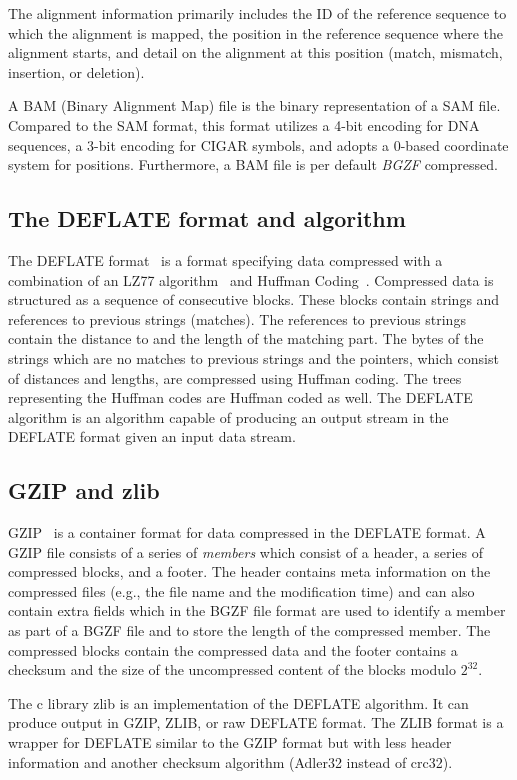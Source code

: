 The alignment information primarily includes the ID of the reference sequence to which the alignment is mapped, the position in the reference sequence where the alignment starts, and detail on the alignment at this position (match, mismatch, insertion, or deletion). 

A BAM (Binary Alignment Map) file is the binary representation of a SAM file. Compared to the SAM format, this format utilizes a 4-bit encoding for DNA sequences, a 3-bit encoding for CIGAR symbols, and adopts a 0-based coordinate system for positions. Furthermore, a BAM file is per default \textit{BGZF} compressed.

\subsection{The DEFLATE format and algorithm}
The DEFLATE format~\cite{deflate} is a format specifying data compressed with a combination of an LZ77 algorithm~\cite{ziv_universal_1977} and Huffman Coding~\cite{huffman_method_1952}. Compressed data is structured as a sequence of consecutive blocks. These blocks contain strings and references to previous strings (matches). The references to previous strings contain the distance to and the length of the matching part. The bytes of the strings which are no matches to previous strings and the pointers, which consist of distances and lengths, are compressed using Huffman coding. The trees representing the Huffman codes are Huffman coded as well. 
The DEFLATE algorithm is an algorithm capable of producing an output stream in the DEFLATE format given an input data stream.

\subsection{GZIP and zlib}
GZIP~\cite{gzip} is a container format for data compressed in the DEFLATE format. A GZIP file consists of a series of \textit{members} which consist of a header, a series of compressed blocks, and a footer. The header contains meta information on the compressed files (e.g., the file name and the modification time) and can also contain extra fields which in the BGZF file format are used to identify a member as part of a BGZF file and to store the length of the compressed member. The compressed blocks contain the compressed data and the footer contains a checksum and the size of the uncompressed content of the blocks modulo $2^{32}$. 

The c library zlib is an implementation of the DEFLATE algorithm. It can produce output in GZIP, ZLIB, or raw DEFLATE format. The ZLIB format is a wrapper for DEFLATE similar to the GZIP format but with less header information and another checksum algorithm (Adler32 instead of crc32).


